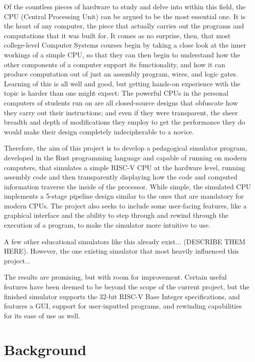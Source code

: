 \documentclass[12pt,twoside]{reedthesis}
\begin{document}
Of the countless pieces of hardware to study and delve into within this field, the CPU (Central Processing Unit) can be argued to be the most essential one. It is the heart of any computer, the piece that actually carries out the programs and computations that it was built for. It comes as no surprise, then, that most college-level Computer Systems courses begin by taking a close look at the inner workings of a simple CPU, so that they can then begin to understand how the other components of a computer support its functionality, and how it can produce computation out of just an assembly program, wires, and logic gates. Learning of this is all well and good, but getting hands-on experience with the topic is harder than one might expect: The powerful CPUs in the personal computers of students run on are all closed-source designs that obfuscate how they carry out their instructions; and even if they were transparent, the sheer breadth and depth of modifications they employ to get the performance they do would make their design completely indecipherable to a novice.

Therefore, the aim of this project is to develop a pedagogical simulator program, developed in the Rust programming language and capable of running on modern computers, that simulates a simple RISC-V CPU at the hardware level, running assembly code and then transparently displaying how the code and computed information traverse the inside of the processor. While simple, the simulated CPU implements a 5-stage pipeline design similar to the ones that are mandatory for modern CPUs. The project also seeks to include some user-facing features, like a graphical interface and the ability to step through and rewind through the execution of a program, to make the simulator more intuitive to use.

A few other educational simulators like this already exist... (DESCRIBE THEM HERE). However, the one existing simulator that most heavily influenced this project...

The results are promising, but with room for improvement. Certain useful features have been deemed to be beyond the scope of the current project, but the finished simulator supports the 32-bit RISC-V Base Integer specifications, and features a GUI, support for user-inputted programs, and rewinding capabilities for its ease of use as well.

\chapter{Background}
\end{document}
